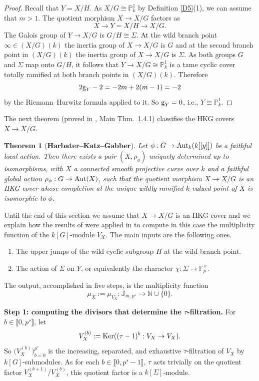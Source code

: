 \documentclass[11pt]{amsart}
\newtheorem{theorem}{Theorem}[section]
\def\Aut{\textup{Aut}}
\def\Ker{\textup{Ker}}
\begin{document}
\begin{proof} Recall that $Y=X/H$. As $X/G\cong\mathbb P^1_k$ by Definition \ref{D5}(1), we can assume that $m>1$. The quotient morphism $X\rightarrow X/G$ factors as
$$X\rightarrow Y=X/H\rightarrow X/G.$$
The Galois group of $Y\rightarrow X/G$ is $G/H\cong\Sigma$. At the wild branch point $\infty\in (X/G)(k)$ the inertia group of $X\rightarrow X/G$ is $G$ and at the second branch point in $(X/G)(k)$ the inertia group of $X\rightarrow X/G$ is $\Sigma$. As both groups $G$ and $\Sigma$ map onto $G/H$, it follows that $Y\rightarrow X/G\cong\mathbb P_k^1$ is a tame cyclic cover totally ramified at both branch points in $(X/G)(k)$. Therefore
$$2\textup{g}_Y-2=-2m+2(m-1)=-2$$
by the Riemann--Hurwitz formula applied to it. So $\textup{g}_Y=0$, i.e., $Y\cong \mathbb P_k^1$.
\end{proof}

\smallskip
The next theorem (proved in \cite{K}, Main Thm.\ 1.4.1) classifies the HKG covers $X\rightarrow X/G$.

\begin{theorem}[{\bf Harbater--Katz--Gabber}]
\label{T4}
Let $\phi:G\rightarrow \Aut_k(k[[y]])$ be a faithful local action. Then there exists a pair $(X,\rho_{\phi})$ uniquely determined up to isomorphisms, with $X$ a  connected smooth projective curve over $k$ and a faithful global action $\rho_{\phi}:G\rightarrow\Aut(X)$, such that the quotient morphism $X\rightarrow X/G$ is an HKG cover whose completion at the unique wildly ramified $k$-valued point of $X$ is isomorphic to $\phi$.
\end{theorem}

Until the end of this section we assume that $X\rightarrow X/G$ is an HKG cover and we explain how the results of \cite{BCK} were applied in \cite{KT2} to compute in this case the multiplicity function of the $k[G]$-module
$V_X$. The main inputs are the following ones.
\begin{enumerate}
\item The upper jumps of the wild cyclic subgroup $H$ at the wild branch point.
\item The action of $\Sigma$ on $Y$, or equivalently the character $\chi:\Sigma\rightarrow \mathbb F_p^\times$.
\end{enumerate}
The output, accomplished in five steps, is the multiplicity function 
$$\mu_X:=\mu_{V_X}:\mathbb J_{m,p^s}\rightarrow\mathbb N\cup\{0\}.$$

{\bf Step 1: computing the divisors that determine the $\tau$-filtration.} For $b\in\llbracket0,p^s\rrbracket$, let
$$V_X^{(b)}:=\Ker((\tau-1)^b:V_X\rightarrow V_X).$$
So $\big(V_X^{(b)}\big)_{b=0}^{p^s}$ is the increasing, separated, and exhaustive $\tau$-filtration of $V_X$
by $k[G]$-submodules. As for each $b\in\llbracket0,p^s-1\rrbracket$, $\tau$ acts trivially on the quotient factor $V_X^{(b+1)}/V_X^{(b)}$, this quotient factor is a $k[\Sigma]$-module. 
\end{document}

